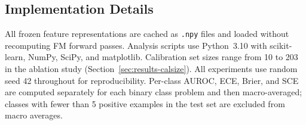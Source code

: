 \subsection{Implementation Details}

All frozen feature representations are cached as \texttt{.npy} files and loaded without
recomputing FM forward passes. Analysis scripts use Python~3.10 with
scikit-learn, NumPy, SciPy, and matplotlib.
Calibration set sizes range from 10 to 203 in the ablation study (Section~\ref{sec:results-calsize}).
All experiments use random seed 42 throughout for reproducibility.
Per-class AUROC, ECE, Brier, and SCE are computed separately for each binary class problem
and then macro-averaged; classes with fewer than 5 positive examples in the test set
are excluded from macro averages.
